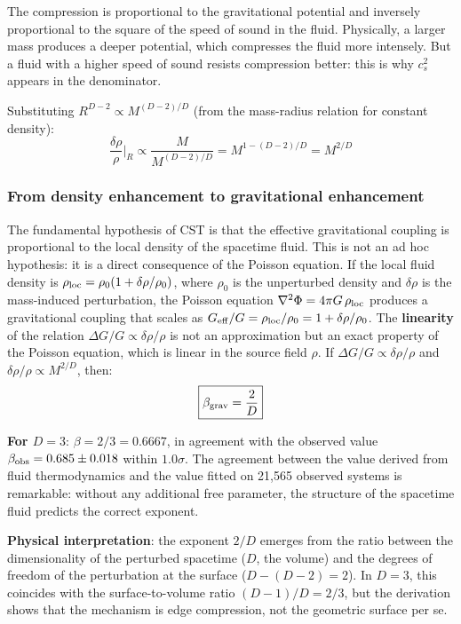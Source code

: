 \documentclass[10pt,a4paper]{article}
\begin{document}
The compression is proportional to the gravitational potential and inversely proportional to the square of the speed of sound in the fluid. Physically, a larger mass produces a deeper potential, which compresses the fluid more intensely. But a fluid with a higher speed of sound resists compression better: this is why $c_s^2$ appears in the denominator. 

Substituting $R^{D-2} \propto M^{(D-2)/D}$ (from the mass-radius relation for constant density):
\begin{equation}
\frac{\delta\rho}{\rho}\bigg|_{R} \propto \frac{M}{M^{(D-2)/D}} = M^{1 - (D-2)/D} = M^{2/D}
\end{equation}

\subsubsection{From density enhancement to gravitational enhancement}

The fundamental hypothesis of CST is that the effective gravitational coupling is proportional to the local density of the spacetime fluid. This is not an ad hoc hypothesis: it is a direct consequence of the Poisson equation. If the local fluid density is $\rho_{\rm loc} = \rho_0(1 + \delta\rho/\rho_0)$, where $\rho_0$ is the unperturbed density and $\delta\rho$ is the mass-induced perturbation, the Poisson equation $\nabla^2\Phi = 4\pi G\,\rho_{\rm loc}$ produces a gravitational coupling that scales as $G_{\rm eff}/G = \rho_{\rm loc}/\rho_0 = 1 + \delta\rho/\rho_0$. The \textbf{linearity} of the relation $\Delta G/G \propto \delta\rho/\rho$ is not an approximation but an exact property of the Poisson equation, which is linear in the source field $\rho$. If $\Delta G/G \propto \delta\rho/\rho$ and $\delta\rho/\rho \propto M^{2/D}$, then:
\begin{equation}\label{eq:beta_result}
\boxed{\beta_{\rm grav} = \frac{2}{D}}
\end{equation}

\textbf{For $D = 3$}: $\beta = 2/3 = 0.6667$, in agreement with the observed value $\beta_{\rm obs} = 0.685 \pm 0.018$ within $1.0\sigma$. The agreement between the value derived from fluid thermodynamics and the value fitted on 21,565 observed systems is remarkable: without any additional free parameter, the structure of the spacetime fluid predicts the correct exponent.

\textbf{Physical interpretation}: the exponent $2/D$ emerges from the ratio between the dimensionality of the perturbed spacetime ($D$, the volume) and the degrees of freedom of the perturbation at the surface ($D - (D-2) = 2$). In $D = 3$, this coincides with the surface-to-volume ratio $(D-1)/D = 2/3$, but the derivation shows that the mechanism is edge compression, not the geometric surface per se.
\end{document}
